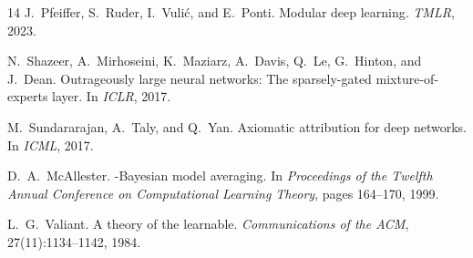 \documentclass[11pt,a4paper]{article}
\begin{document}
\begin{thebibliography}{14}
J.~Pfeiffer, S.~Ruder, I.~Vuli\'{c}, and E.~Ponti.
\newblock Modular deep learning.
\newblock \emph{TMLR}, 2023.

N.~Shazeer, A.~Mirhoseini, K.~Maziarz, A.~Davis, Q.~Le, G.~Hinton, and J.~Dean.
\newblock Outrageously large neural networks: The sparsely-gated mixture-of-experts layer.
\newblock In \emph{ICLR}, 2017.

M.~Sundararajan, A.~Taly, and Q.~Yan.
\newblock Axiomatic attribution for deep networks.
\newblock In \emph{ICML}, 2017.

D.~A.~McAllester.
-{B}ayesian model averaging.
\newblock In \emph{Proceedings of the Twelfth Annual Conference on Computational Learning Theory}, pages 164--170, 1999.

L.~G.~Valiant.
\newblock A theory of the learnable.
\newblock \emph{Communications of the ACM}, 27(11):1134--1142, 1984.

\end{thebibliography}
\end{document}

